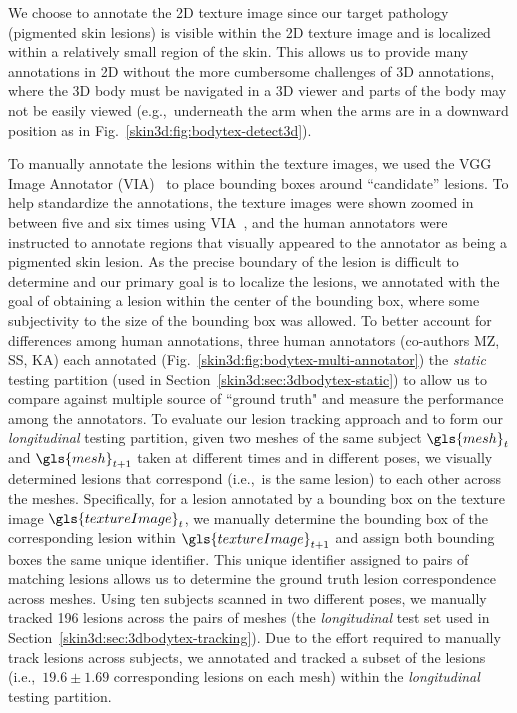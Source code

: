 \documentclass[journal]{IEEEtran}
\def\ie{i.e.,~}
\def\eg{e.g.,~}
\begin{document}
We choose to annotate the 2D texture image since our target pathology (pigmented skin lesions) is visible within the 2D texture image and is localized within a relatively small region of the skin. This allows us to provide many annotations in 2D without the more cumbersome challenges of 3D annotations, where the 3D body must be navigated in a 3D viewer and parts of the body may not be easily viewed (\eg underneath the arm when the arms are in a downward position as in Fig.~\ref{skin3d:fig:bodytex-detect3d}).

To manually annotate the lesions within the texture images, we used the VGG Image Annotator (VIA)~\citep{Dutta2019,dutta2016via} to place bounding boxes around ``candidate'' lesions. To help standardize the annotations, the texture images were shown zoomed in between five and six times using VIA~\citep{dutta2016via}, and the human annotators were instructed to annotate regions that visually appeared to the annotator as being a pigmented skin lesion. As the precise boundary of the lesion is difficult to determine and our primary goal is to localize the lesions, we annotated with the goal of obtaining a lesion within the center of the bounding box, where some subjectivity to the size of the bounding box was allowed. To better account for differences among human annotations, three human annotators (co-authors MZ, SS, KA) each annotated (Fig.~\ref{skin3d:fig:bodytex-multi-annotator}) the \emph{static} testing partition (used in Section~\ref{skin3d:sec:3dbodytex-static}) to allow us to compare against multiple source of ``ground truth" and measure the performance among the annotators. To evaluate our lesion tracking approach and to form our \emph{longitudinal} testing partition, given two meshes of the same subject $\gls{mesh}_t$ and $\gls{mesh}_{t+1}$ taken at different times and in different poses, we visually determined lesions that correspond (\ie is the same lesion) to each other across the meshes. Specifically, for a lesion annotated by a bounding box on the texture image $\gls{textureImage}_t$, we manually determine the bounding box of the corresponding lesion within $\gls{textureImage}_{t+1}$ and assign both bounding boxes the same unique identifier. This unique identifier assigned to pairs of matching lesions allows us to determine the ground truth lesion correspondence across meshes. Using ten subjects scanned in two different poses, we manually tracked 196 lesions across the pairs of meshes (the \emph{longitudinal} test set used in Section~\ref{skin3d:sec:3dbodytex-tracking}). Due to the effort required to manually track lesions across subjects, we annotated and tracked a subset of the lesions (\ie $19.6 \pm 1.69$ corresponding lesions on each mesh) within the \emph{longitudinal} testing partition. 
\end{document}

